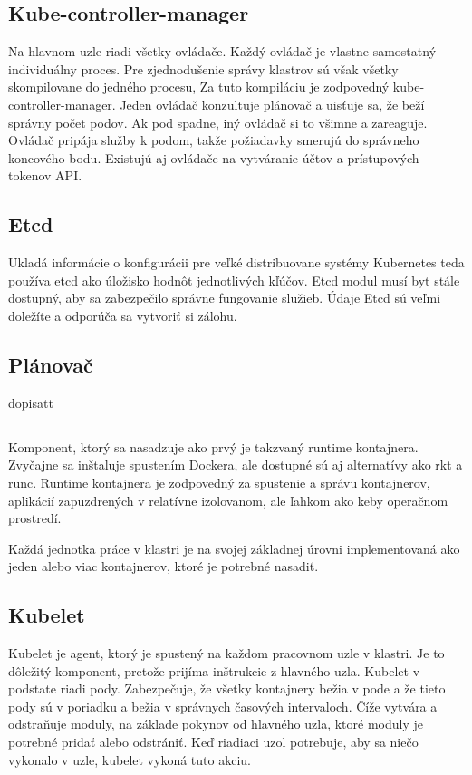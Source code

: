\subsection*{Kube-controller-manager}
Na hlavnom uzle riadi všetky ovládače. Každý ovládač je vlastne samostatný individuálny proces. Pre zjednodušenie správy klastrov sú však všetky skompilovane do jedného procesu, Za tuto kompiláciu je zodpovedný kube-controller-manager. Jeden ovládač konzultuje plánovač a uisťuje sa, že beží správny počet podov. Ak pod spadne, iný ovládač si to všimne a zareaguje. Ovládač pripája služby k podom, takže požiadavky smerujú do správneho koncového bodu. Existujú aj ovládače na vytváranie účtov a prístupových tokenov API.

\subsection*{Etcd}
Ukladá informácie o konfigurácii pre veľké distribuovane systémy  Kubernetes teda používa etcd ako úložisko hodnôt jednotlivých kľúčov. Etcd modul musí byt stále dostupný, aby sa zabezpečilo správne fungovanie služieb. Údaje Etcd sú veľmi doležíte a odporúča sa vytvoriť si zálohu. 

\subsection*{Plánovač}
dopisatt
\subsection*{}
Komponent, ktorý sa nasadzuje ako prvý je takzvaný runtime kontajnera. Zvyčajne sa inštaluje spustením Dockera, ale dostupné sú aj alternatívy ako rkt a runc.
Runtime kontajnera je zodpovedný za spustenie a správu kontajnerov, aplikácií zapuzdrených v relatívne izolovanom, ale ľahkom ako keby operačnom prostredí. 

Každá jednotka práce v klastri je na svojej základnej úrovni implementovaná ako jeden alebo viac kontajnerov, ktoré je potrebné nasadiť.
 

\subsection*{Kubelet}
Kubelet je agent, ktorý je spustený na každom pracovnom uzle v klastri. Je to dôležitý komponent, pretože prijíma inštrukcie z hlavného uzla. Kubelet v podstate riadi pody. Zabezpečuje, že všetky kontajnery bežia v pode a že tieto pody sú v poriadku a bežia v správnych časových intervaloch. Číže vytvára a odstraňuje moduly, na základe pokynov od hlavného uzla, ktoré moduly je potrebné pridať alebo odstrániť. Keď riadiaci uzol potrebuje, aby sa niečo vykonalo v uzle, kubelet vykoná tuto akciu.

